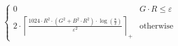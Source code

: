 \[\begin{cases} 0 & G \cdot R \leq \varepsilon \\ 2 \cdot \left\lceil \frac{1024 \cdot R^{2} \cdot \left(G^{2} + B^{2} \cdot R^{2}\right) \cdot \log\left(\frac{8}{\delta}\right)}{\varepsilon^{2}} \right\rceil_{+} & \mathrm{otherwise} \end{cases}\]

